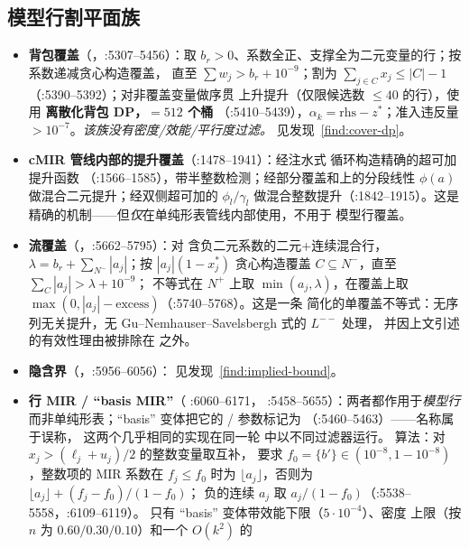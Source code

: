 \documentclass[11pt]{ctexart}
\begin{document}
\subsection{模型行割平面族}
\label{sec:model-row-cuts}
\begin{itemize}[nosep]
\item \textbf{背包覆盖}（，:5307--5456）：取
  $b_r>0$、系数全正、支撑全为二元变量的行；按系数递减贪心构造覆盖，
  直至 $\sum w_j > b_r + 10^{-9}$；割为
  $\sum_{j\in C} x_j \le |C| - 1$（:5390--5392）；对非覆盖变量做序贯
  上升提升（仅限候选数 $\le 40$ 的行），使用
  \textbf{离散化背包 DP，$=512$ 个桶}
  （:5410--5439），$\alpha_k = \mathrm{rhs} - z^*$；准入违反量
  $>10^{-7}$。\emph{该族没有密度/效能/平行度过滤。}
  见发现~\ref{find:cover-dp}。
\item \textbf{cMIR 管线内部的提升覆盖}（:1478--1941）：经注水式
   循环构造精确的超可加提升函数
  （:1566--1585），带半整数检测；经部分覆盖和上的分段线性
  $\phi(a)$ 做混合二元提升；经双侧超可加的
  $\phi_l/\gamma_l$ 做混合整数提升（:1842--1915）。这是
  精确的机制——但\emph{仅}在单纯形表管线内部使用，不用于
  模型行覆盖。
\item \textbf{流覆盖}（，:5662--5795）：对
  含负二元系数的二元+连续混合行，
  $\lambda = b_r + \sum_{N^-}|a_j|$；按 $|a_j|(1-x_j^*)$
  贪心构造覆盖 $C\subseteq N^-$，直至 $\sum_C |a_j| > \lambda + 10^{-9}$；
  不等式在 $N^+$ 上取 $\min(a_j,\lambda)$，在覆盖上取
  $\max(0,|a_j|-\mathrm{excess})$（:5740--5768）。这是一条
  简化的单覆盖不等式：无序列无关提升，无
  Gu--Nemhauser--Savelsbergh 式的 $L^{--}$ 处理，
  并因上文引述的有效性理由被排除在  之外。
\item \textbf{隐含界}（，:5956--6056）：
  见发现~\ref{find:implied-bound}。
\item \textbf{行 MIR / ``basis MIR''}（ :6060--6171，
   :5458--5655）：两者都作用于\emph{模型行}
  而非单纯形表；``basis'' 变体把它的 /
  参数标记为 （:5460--5463）——名称属于误称，
  这两个几乎相同的实现在同一轮  中以不同过滤器运行。
  算法：对 $x_j > (\ell_j+u_j)/2$ 的整数变量取互补，
  要求 $f_0 = \{b'\} \in (10^{-8}, 1-10^{-8})$，整数项的 MIR
  系数在 $f_j \le f_0$ 时为 $\lfloor a_j \rfloor$，否则为
  $\lfloor a_j \rfloor + (f_j - f_0)/(1-f_0)$；
  负的连续 $a_j$ 取 $a_j/(1-f_0)$（:5538--5558，:6109--6119）。
  只有 ``basis'' 变体带效能下限（$5\cdot10^{-4}$）、密度
  上限（按 $n$ 为 $0.60/0.30/0.10$）和一个 $O(k^2)$ 的

\end{itemize}
\end{document}

